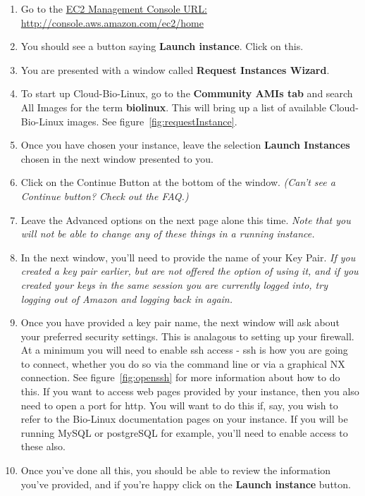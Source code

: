 \begin{enumerate}
\item Go to the \href{http://console.aws.amazon.com/ec2/home}{EC2 Management Console URL: http://console.aws.amazon.com/ec2/home}
\item You should see a button saying \textbf{Launch instance}. Click on this. 
\item You are presented with a window called \textbf{Request Instances Wizard}. 
\item To start up Cloud-Bio-Linux, go to the \textbf{Community AMIs tab} and search All Images for the term \textbf{biolinux}. This will bring up a list of available Cloud-Bio-Linux images. See figure~\ref{fig:requestInstance}.
\item Once you have chosen your instance, leave the selection \textbf{Launch Instances} chosen in the next window presented to you.
\item Click on the Continue Button at the bottom of the window. \emph{(Can't see a Continue button? Check out the FAQ.)}
\item Leave the Advanced options on the next page alone this time. \emph{Note that you will not be able to change any of these things in a running instance.}
\item In the next window, you'll need to provide the name of your Key Pair. \emph{If you created a key pair earlier, but are not offered the option of using it, and if you created your keys in the same session you are currently logged into, try logging out of Amazon and logging back in again.}
\item Once you have provided a key pair name, the next window will ask about your preferred security settings. This is analagous to setting up your firewall. At a minimum you will need to enable ssh access - ssh is how you are going to connect, whether you do so via the command line or via a graphical NX connection. See figure~\ref{fig:openssh} for more information about how to do this. If you want to access web pages provided by your instance, then you also need to open a port for http. You will want to do this if, say, you wish to refer to the Bio-Linux documentation pages on your instance. If you will be running MySQL or postgreSQL for example, you'll need to enable access to these also.
\item Once you've done all this, you should be able to review the information you've provided, and if you're happy click on the \textbf{Launch instance} button.
\end{enumerate}

